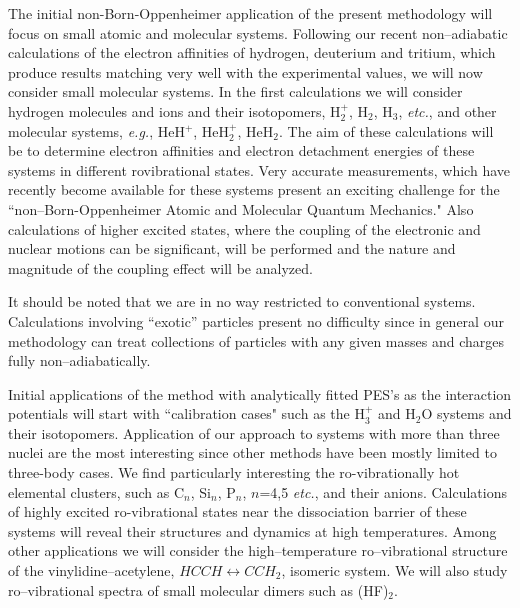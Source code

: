 The initial non-Born-Oppenheimer 
application of the present methodology 
will focus on
small atomic and molecular systems.
Following our recent non--adiabatic calculations
of the electron affinities of hydrogen, deuterium and tritium,
which produce results matching very well with the experimental
values, we will now consider small molecular systems.
In the first calculations 
we will consider
hydrogen molecules and ions and their isotopomers,
H$_2^+$, H$_2$, H$_3$, {\it etc.}, 
and other molecular systems, {\it e.g.}, HeH$^+$, HeH$_2^+$, HeH$_2$.  
The aim of these calculations will be to determine 
electron affinities and electron detachment energies 
of these systems in different rovibrational states.
Very accurate measurements, which have 
recently become
available 
for these systems
present an exciting challenge for 
the ``non--Born-Oppenheimer Atomic and Molecular Quantum Mechanics."
Also calculations of 
higher excited states,
where the coupling of the electronic and nuclear motions
can be significant, 
will be performed and the nature and magnitude of the 
coupling effect will be 
analyzed.

It should be noted that we are in no way restricted to conventional systems.
Calculations involving ``exotic'' particles present no difficulty 
since in general our methodology can treat collections of particles
with any given masses and charges fully non--adiabatically.  

Initial applications of the method with 
analytically fitted PES's as the 
interaction potentials
will start with 
``calibration cases"
such as the H$_3^+$ and H$_2$O systems and their 
isotopomers.
%
Application of our approach to systems with more than three
nuclei are the most interesting since 
other methods have been mostly limited to three-body cases.
We find particularly interesting 
the
ro-vibrationally hot elemental clusters, such as
C$_n$, Si$_n$, P$_n$, $n$=4,5 {\it etc.}, and their anions.
Calculations of highly excited ro-vibrational states near the
dissociation barrier of
these systems will reveal their structures and dynamics 
at high temperatures.
Among other applications we will consider
the high--temperature
ro--vibrational structure  
of the vinylidine--acetylene,
$HCCH \leftrightarrow CCH_2$, isomeric system.
We will also study
ro--vibrational spectra 
of small molecular dimers such
as (HF)$_2$.

